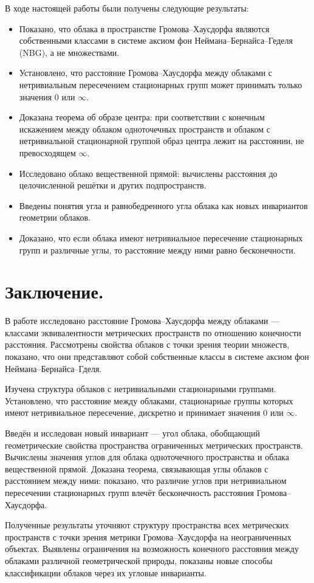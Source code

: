 В ходе настоящей работы были получены следующие результаты:
\begin{itemize}
  \item Показано, что облака в пространстве Громова--Хаусдорфа
    являются собственными классами в системе аксиом фон
    Неймана--Бернайса--Геделя (NBG), а не множествами.
  \item Установлено, что расстояние Громова--Хаусдорфа между облаками
    с нетривиальным пересечением стационарных групп может принимать
    только значения \( 0 \) или \( \infty \).
  \item Доказана теорема об образе центра: при соответствии с
    конечным искажением  между облаком одноточечных пространств и
    облаком с нетривиальной стационарной группой образ центра лежит
    на расстоянии, не превосходящем \( \infty \).
  \item Исследовано облако вещественной прямой: вычислены расстояния
    до целочисленной решётки и других подпространств.
  \item Введены понятия угла и равнобедренного угла облака как новых
    инвариантов геометрии облаков.
  \item Доказано, что если облака имеют нетривиальное пересечение
    стационарных групп и различные углы, то расстояние между ними
    равно бесконечности.
\end{itemize}
\section{Заключение.}
В работе исследовано расстояние Громова--Хаусдорфа между облаками ---
классами эквивалентности метрических пространств по отношению
конечности расстояния. Рассмотрены свойства облаков с точки зрения
теории множеств, показано, что они представляют собой собственные
классы в системе аксиом фон Неймана--Бернайса--Гделя.

Изучена структура облаков с нетривиальными стационарными группами.
Установлено, что
расстояние между облаками, стационарные группы которых имеют
нетривиальное пересечение, дискретно и принимает значения \( 0 \) или
\( \infty \).

Введён и исследован новый инвариант --- угол облака, обобщающий
геометрические свойства пространства ограниченных метрических
пространств. Вычислены значения углов для облака одноточечного
пространства и облака вещественной прямой. Доказана теорема,
связывающая углы облаков с расстоянием между ними: показано, что
различие углов при нетривиальном пересечении стационарных групп
влечёт бесконечность расстояния Громова--Хаусдорфа.

Полученные результаты уточняют структуру пространства всех
метрических пространств с точки зрения метрики Громова--Хаусдорфа на
неограниченных объектах. Выявлены ограничения на возможность
конечного расстояния между облаками различной геометрической природы,
показаны новые способы классификации облаков через их угловые инварианты.
